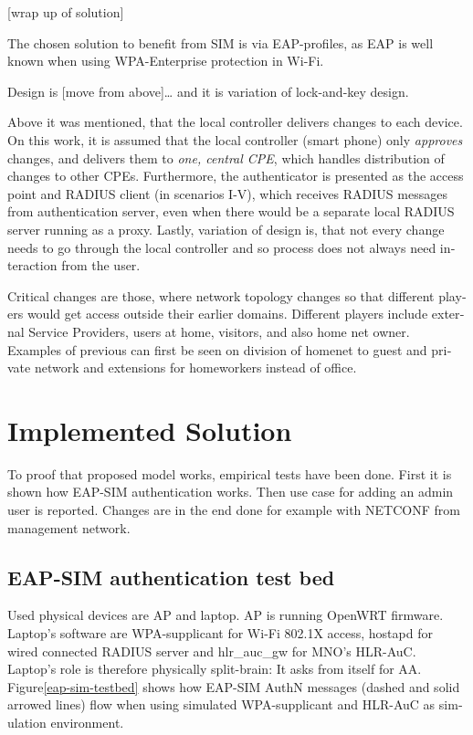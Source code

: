 \documentclass[12pt,a4paper,english]{tutthesis}
\begin{document}
\begin{otherlanguage}{english}
[wrap up of solution]

The chosen solution to benefit from SIM is via EAP-profiles, as EAP
is well known when using WPA-Enterprise protection in Wi-Fi.

Design is [move from above]\ldots{}
and it is variation of lock-and-key design.

Above it was mentioned, that the local controller delivers changes to each
device. On this work, it is assumed that the local controller (smart
phone) only \emph{approves} changes,
and delivers them to \emph{one, central CPE}, 
which handles distribution of changes to other CPEs.
Furthermore, the authenticator is presented as the access point and
RADIUS client (in scenarios I-V), which receives RADIUS messages from
authentication server, even when there would be a separate local RADIUS server
running as a proxy.
Lastly, variation of design is, that not every change needs to go
 through  the local controller and so process does not always need
interaction from the user.



Critical changes are those, where network topology changes so
that different players would get access outside their earlier domains.
Different players include external Service Providers, users at home,
visitors, and also home net owner. Examples of previous can first be
seen on division of homenet to guest and private network and
extensions for homeworkers instead of office.


\chapter{Implemented Solution}
\label{sec-5}


To proof that proposed model works, empirical tests have been done.
First it is shown how EAP-SIM authentication works. Then use case for
adding an admin user is reported. Changes are in the end done 
for example with NETCONF from management network.

\section{EAP-SIM authentication test bed}
\label{sec-5-1}



Used physical devices are AP and laptop.  AP is running OpenWRT
firmware.  Laptop's software are WPA-supplicant for Wi-Fi 802.1X access,
hostapd for wired connected RADIUS server and hlr\_auc\_gw for MNO's
HLR-AuC.
Laptop's role is therefore physically split-brain: It asks from itself for AA. 
Figure\ref{eap-sim-testbed} shows how EAP-SIM AuthN messages (dashed
and solid arrowed lines) flow when using 
simulated WPA-supplicant and HLR-AuC as simulation environment.


\end{otherlanguage}
\end{document}
